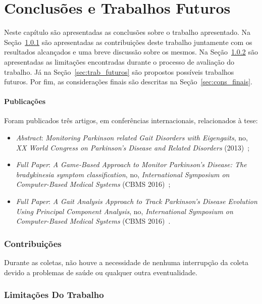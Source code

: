 \chapter{Conclusões e Trabalhos Futuros}\label{chapter:conclusoes_futuros}
Neste capítulo são apresentadas as conclusões sobre o trabalho apresentado. Na Seção~\ref{sec:contribuicoes} são apresentadas as contribuições deste trabalho juntamente com os resultados alcançados e uma breve discussão sobre os mesmos. Na Seção~\ref{sec:limitacoes} são apresentadas as limitações encontradas durante o processo de avaliação do trabalho. Já na Seção~\ref{sec:trab_futuros} são propostos possíveis trabalhos futuros. Por fim, as considerações finais são descritas na Seção~\ref{sec:cons_finais}.

\subsubsection{Publicações}
Foram publicados três artigos, em conferências internacionais, relacionados à tese: 
  \begin{itemize}
   \item \textit{Abstract}: \textit{Monitoring Parkinson related Gait Disorders with Eigengaits}, no, \textit{XX World Congress on Parkinson's Disease and Related Disorders} (2013)~\cite{lmmeigengaits2013};
   \item \textit{Full Paper}: \textit{A Game-Based Approach to Monitor Parkinson’s Disease: The bradykinesia symptom classification}, no, \textit{International Symposium on Computer-Based Medical Systems} (CBMS 2016)~\cite{lmmcbmsgame2016};
   \item \textit{Full Paper}: \textit{A Gait Analysis Approach to Track Parkinson’s Disease Evolution Using Principal Component Analysis}, no, \textit{International Symposium on Computer-Based Medical Systems} (CBMS 2016)~\cite{lmmcbmsgait2016}.
  \end{itemize}


\subsection{Contribuições}\label{sec:contribuicoes}

Durante as coletas, não houve a necessidade de nenhuma interrupção da coleta devido a problemas de saúde ou qualquer outra eventualidade.

\subsection{Limitações Do Trabalho}\label{sec:limitacoes}

